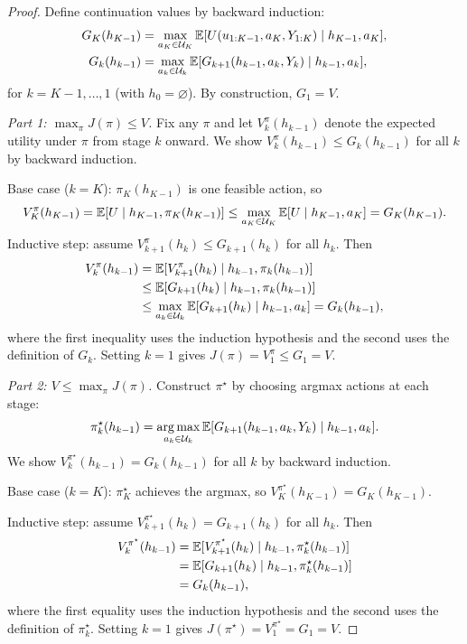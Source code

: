 \begin{proof}
Define continuation values by backward induction:
\begin{align}
G_K(h_{K-1}) &= \max_{a_K \in \mathcal{U}_K} \operatorname{\mathbb{E}}[U(u_{1:K-1}, a_K, Y_{1:K}) \mid h_{K-1}, a_K], \\
G_k(h_{k-1}) &= \max_{a_k \in \mathcal{U}_k} \operatorname{\mathbb{E}}[G_{k+1}(h_{k-1}, a_k, Y_k) \mid h_{k-1}, a_k],
\end{align}
for $k = K{-}1, \ldots, 1$ (with $h_0 = \varnothing$). By construction, $G_1 = V$.

\emph{Part 1: $\max_\pi J(\pi) \leq V$.}
Fix any $\pi$ and let $V_k^\pi(h_{k-1})$ denote the expected utility under $\pi$ from stage $k$ onward. We show $V_k^\pi(h_{k-1}) \leq G_k(h_{k-1})$ for all $k$ by backward induction.

Base case ($k=K$): $\pi_K(h_{K-1})$ is one feasible action, so
\begin{equation}
V_K^\pi(h_{K-1}) = \operatorname{\mathbb{E}}[U \mid h_{K-1}, \pi_K(h_{K-1})] \leq \max_{a_K \in \mathcal{U}_K} \operatorname{\mathbb{E}}[U \mid h_{K-1}, a_K] = G_K(h_{K-1}).
\end{equation}
Inductive step: assume $V_{k+1}^\pi(h_k) \leq G_{k+1}(h_k)$ for all $h_k$. Then
\begin{align}
V_k^\pi(h_{k-1}) &= \operatorname{\mathbb{E}}[V_{k+1}^\pi(h_k) \mid h_{k-1}, \pi_k(h_{k-1})] \\
&\leq \operatorname{\mathbb{E}}[G_{k+1}(h_k) \mid h_{k-1}, \pi_k(h_{k-1})] \\
&\leq \max_{a_k \in \mathcal{U}_k} \operatorname{\mathbb{E}}[G_{k+1}(h_k) \mid h_{k-1}, a_k] = G_k(h_{k-1}),
\end{align}
where the first inequality uses the induction hypothesis and the second uses the definition of $G_k$. Setting $k=1$ gives $J(\pi) = V_1^\pi \leq G_1 = V$.

\emph{Part 2: $V \leq \max_\pi J(\pi)$.}
Construct $\pi^\star$ by choosing argmax actions at each stage:
\begin{equation}
\pi_k^\star(h_{k-1}) = \operatorname*{arg\,max}_{a_k \in \mathcal{U}_k} \operatorname{\mathbb{E}}[G_{k+1}(h_{k-1},a_k,Y_k) \mid h_{k-1},a_k].
\end{equation}
We show $V_k^{\pi^\star}(h_{k-1}) = G_k(h_{k-1})$ for all $k$ by backward induction.

Base case ($k=K$): $\pi_K^\star$ achieves the argmax, so $V_K^{\pi^\star}(h_{K-1}) = G_K(h_{K-1})$.

Inductive step: assume $V_{k+1}^{\pi^\star}(h_k) = G_{k+1}(h_k)$ for all $h_k$. Then
\begin{align}
V_k^{\pi^\star}(h_{k-1}) &= \operatorname{\mathbb{E}}[V_{k+1}^{\pi^\star}(h_k) \mid h_{k-1}, \pi_k^\star(h_{k-1})] \\
&= \operatorname{\mathbb{E}}[G_{k+1}(h_k) \mid h_{k-1}, \pi_k^\star(h_{k-1})] \\
&= G_k(h_{k-1}),
\end{align}
where the first equality uses the induction hypothesis and the second uses the definition of $\pi_k^\star$. Setting $k=1$ gives $J(\pi^\star) = V_1^{\pi^\star} = G_1 = V$.
\end{proof}

